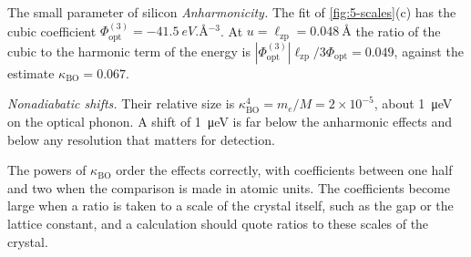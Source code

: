 \begin{workedexample}{The small parameter of silicon}
\emph{Anharmonicity.} The fit of \cref{fig:5-scales}(c) has the cubic coefficient $\Phi^{(3)}_{\mathrm{opt}} = \SI{-41.5}{eV.\angstrom^{-3}}$. At $u = \ell_{\mathrm{zp}} = \SI{0.048}{\angstrom}$ the ratio of the cubic to the harmonic term of the energy is $|\Phi^{(3)}_{\mathrm{opt}}|\ell_{\mathrm{zp}}/3\Phi_{\mathrm{opt}} = 0.049$, against the estimate $\kappa_{\mathrm{BO}} = 0.067$.

\emph{Nonadiabatic shifts.} Their relative size is $\kappa_{\mathrm{BO}}^4 = m_e/M = 2\times10^{-5}$, about \SI{1}{\micro eV} on the optical phonon. A shift of \SI{1}{\micro eV} is far below the anharmonic effects and below any resolution that matters for detection.

The powers of $\kappa_{\mathrm{BO}}$ order the effects correctly, with coefficients between one half and two when the comparison is made in atomic units. The coefficients become large when a ratio is taken to a scale of the crystal itself, such as the gap or the lattice constant, and a calculation should quote ratios to these scales of the crystal.
\end{workedexample}
